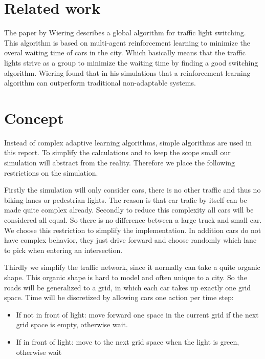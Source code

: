 \documentclass[a4paper,11pt]{article}
\begin{document}
\section{Related work}\label{sec:rel}


The paper by Wiering \cite{Wiering00} describes a global algorithm for traffic light switching.
This algorithm is based on multi-agent reinforcement learning to minimize the overal waiting time of cars in the city.
Which basically means that the traffic lights strive as a group to minimize the waiting time by finding a good switching algorithm.
Wiering found that in his simulations that a reinforcement learning algorithm can outperform traditional non-adaptable systems.

\section{Concept}\label{sec:concept}

Instead of complex adaptive learning algorithms, simple algorithms are used in this report.
To simplify the calculations and to keep the scope small our simulation will abstract from the reality.
Therefore we place the following restrictions on the simulation.

Firstly the simulation will only consider cars, there is no other traffic and thus no biking lanes or pedestrian lights.
The reason is that car trafic by itself can be made quite complex already.
Secondly to reduce this complexity all cars will be considered all equal.
So there is no difference between a large truck and small car.
We choose this restriction to simplify the implementation.
In addition cars do not have complex behavior, they just drive forward and choose randomly which lane to pick when entering an intersection.

Thirdly we simplify the traffic network, since it normally can take a quite organic shape.
This organic shape is hard to model and often unique to a city.
So the roads will be generalized to a grid, in which each car takes up exactly one grid space.
Time will be discretized by allowing cars one action per time step:
\begin{itemize}
 \item If not in front of light: move forward one space in the current grid if the next grid space is empty, otherwise wait.
 \item If in front of light: move to the next grid space when the light is green, otherwise wait
\end{itemize}
\end{document}
